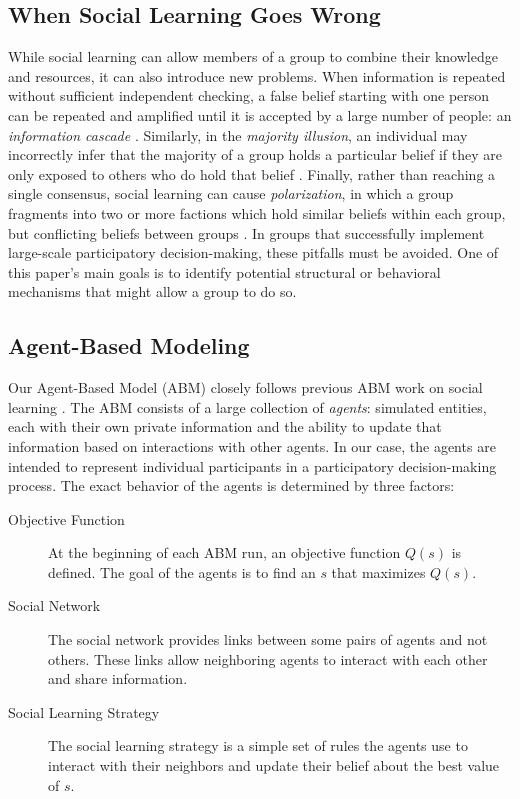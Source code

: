 \documentclass[manuscript,screen,review,acmsmall]{acmart}
\begin{document}
\subsection{When Social Learning Goes Wrong}
While social learning can allow members of a group to combine their knowledge and resources,
it can also introduce new problems.
When information is repeated without sufficient independent checking,
a false belief starting with one person can be repeated and amplified until it is accepted by a large number of people:
an {\em information cascade} \cite{banerjee_simple_1992}.
Similarly, in the {\em majority illusion},
an individual may incorrectly infer that the majority of a group holds a particular belief if they are only exposed to others who do hold that belief \cite{lerman_majority_2015}.
Finally,
rather than reaching a single consensus,
social learning can cause {\em polarization},
in which a group fragments into two or more factions which hold similar beliefs within each group,
but conflicting beliefs between groups
\cite{schkade_what_2007}.
In groups that successfully implement large-scale participatory decision-making,
these pitfalls must be avoided.
One of this paper's main goals is to identify potential structural or behavioral mechanisms that might allow a group to do so.

\subsection{Agent-Based Modeling\label{subsec:abm}}
Our Agent-Based Model (ABM) closely follows previous ABM work on social learning
\cite{lazer_network_2007, barkoczi_social_2016, gomez_clustering_2019}.
The ABM consists of a large collection of {\em agents}:
simulated entities, each with their own private information and the ability to update that information based on interactions with other agents.
In our case, the agents are intended to represent
individual participants in a participatory decision-making
process.
The exact behavior of the agents is determined by three factors:
\begin{description}
\item[Objective Function]
At the beginning of each ABM run, an objective function $Q(s)$ is defined.
The goal of the agents is to find an $s$ that maximizes
$Q(s)$.
\item[Social Network]
The social network provides links between some pairs of agents and not others.
These links allow neighboring agents to interact with each other and share information.
\item[Social Learning Strategy]
The social learning strategy is a simple set of rules the agents use to interact with their neighbors and update their belief about the best value of $s$.
\end{description}
\end{document}
